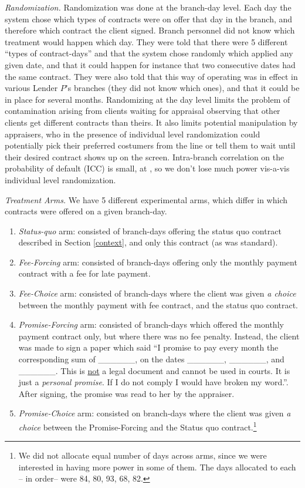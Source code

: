 \documentclass[11pt]{article}
\begin{document}
\vspace{.2in}
\noindent \textit{Randomization.} Randomization was done at the branch-day level.  Each day the system chose which types of contracts were on offer that day in the branch, and therefore which contract the client signed. Branch personnel did not know which treatment would happen which day. They were told that there were 5 different ``types of contract-days'' and that the system chose randomly which applied any given date, and that it could happen for instance that two consecutive dates had the same contract. They were also told that this way of operating was in effect in various Lender $P$'s branches (they did not know which ones), and that it could be in place for several months. Randomizing at the day level limits the problem of contamination arising from clients waiting for appraisal observing that other clients get different contracts than theirs. It also limits potential  manipulation by appraisers, who in the presence of individual level randomization could potentially pick their preferred costumers from the line or tell them to wait until their desired contract shows up on the screen. Intra-branch correlation on the probability of default (ICC) is small, at , so we don't lose much power vis-a-vis individual level randomization.

\vspace{.2in}
\noindent \textit{Treatment Arms.} We have 5 different experimental arms, which differ in which contracts were offered on a given branch-day. 

\begin{enumerate}
    \item \textit{Status-quo} arm: consisted of branch-days offering the status quo contract described in Section \ref{context}, and only this contract (as was standard). 
    \item \textit{Fee-Forcing} arm: consisted of branch-days offering only the monthly payment contract with a fee for late payment. 
    \item \textit{Fee-Choice} arm: consisted of branch-days where the client was given \textit{a choice} between the monthly payment with fee contract, and the status quo contract.
    \item \textit{Promise-Forcing} arm: consisted of branch-days which offered the monthly payment contract only, but where there was no fee penalty. Instead, the client was made to sign a paper which said ``I promise to pay every month the corresponding sum of \_\_\_\_\_\_, on the dates \_\_\_\_\_\_, \_\_\_\_\_\_, and \_\_\_\_\_\_. This is \underline{not} a legal document and cannot be used in courts. It is just a \textit{personal promise}. If I do not comply I would have broken my word.''. After signing, the promise was read to her by the appraiser.
    \item \textit{Promise-Choice} arm: consisted on branch-days where the client was given \textit{a choice} between the Promise-Forcing and the Status quo contract.\footnote{We did not allocate equal number of days across arms, since we were interested in having more power in some of them. The days allocated to each -- in order-- were 84, 80, 93, 68, 82.}
\end{enumerate}
\end{document}
